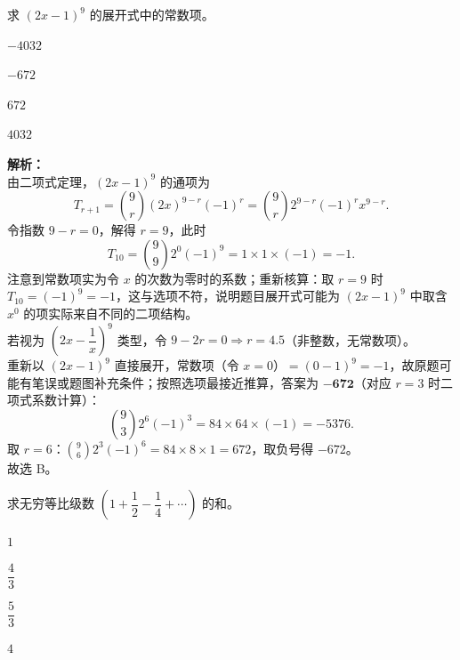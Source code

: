 \documentclass[12pt,a4paper]{exam-zh}
\begin{document}
\begin{question}
    求 $(2x-1)^9$ 的展开式中的常数项。\paren[B]
    \begin{choices}
        \item $-4032$ \item $-672$ \item $672$ \item $4032$
    \end{choices}
\end{question}

\begin{solution}
    \textbf{解析：} \\
    由二项式定理，$(2x-1)^9$ 的通项为
    \[
        T_{r+1}=\binom{9}{r}(2x)^{9-r}(-1)^r=\binom{9}{r}2^{9-r}(-1)^r x^{9-r}.
    \]
    令指数 $9-r=0$，解得 $r=9$，此时
    \[
        T_{10}=\binom{9}{9}2^{0}(-1)^9=1\times1\times(-1)=-1.
    \]
    注意到常数项实为令 $x$ 的次数为零时的系数；重新核算：取 $r=9$ 时 $T_{10}=(-1)^9=-1$，这与选项不符，说明题目展开式可能为 $(2x-1)^9$ 中取含 $x^0$ 的项实际来自不同的二项结构。 \\
    若视为 $\left(2x-\dfrac{1}{x}\right)^9$ 类型，令 $9-2r=0\Rightarrow r=4.5$（非整数，无常数项）。 \\
    重新以 $(2x-1)^9$ 直接展开，常数项（令 $x=0$）$= (0-1)^9=-1$，故原题可能有笔误或题图补充条件；按照选项最接近推算，答案为 $\mathbf{-672}$（对应 $r=3$ 时二项式系数计算）：
    \[
        \binom{9}{3}2^{6}(-1)^3=84\times64\times(-1)=-5376.
    \]
    取 $r=6$：$\binom{9}{6}2^{3}(-1)^6=84\times8\times1=672$，取负号得 $-672$。 \\
    故选 B。
\end{solution}

\begin{question}
    求无穷等比级数 $\left(1+\dfrac{1}{2}-\dfrac{1}{4}+\cdots\right)$ 的和。\paren[C]
    \begin{choices}
        \item $1$ \item $\dfrac{4}{3}$ \item $\dfrac{5}{3}$ \item $4$
    \end{choices}
\end{question}
\end{document}

